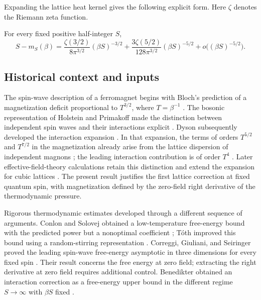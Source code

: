 Expanding the lattice heat kernel gives the following explicit form.
Here $\zeta$ denotes the Riemann zeta function.
\begin{corollary}\label{cor:expansion}
For every fixed positive half-integer $S$,
\[
 S-m_S(\beta)
 =\frac{\zeta(3/2)}{8\pi^{3/2}}(\beta S)^{-3/2}
  +\frac{3\zeta(5/2)}{128\pi^{3/2}}(\beta S)^{-5/2}
  +o\bigl((\beta S)^{-5/2}\bigr).
\]
\end{corollary}

\subsection{Historical context and inputs}

The spin-wave description of a ferromagnet begins with Bloch's prediction
of a magnetization deficit proportional to \(T^{3/2}\), where \(T=\beta^{-1}\)
\cite{Bloch1930}.  The bosonic representation of Holstein and Primakoff
made the distinction between independent spin waves and their interactions
explicit \cite{HolsteinPrimakoff1940}.  Dyson subsequently developed the
interaction expansion \cite{Dyson1956a,Dyson1956b}.  In that expansion,
the terms of orders \(T^{5/2}\) and \(T^{7/2}\) in the magnetization already
arise from the lattice dispersion of independent magnons
\cite[Section~5, Equation~(71)]{Dyson1956b}; the leading interaction
contribution is of order \(T^4\)
\cite[Section~8, Equation~(122)]{Dyson1956b}.
Later effective-field-theory calculations retain this distinction and
extend the expansion for cubic lattices \cite{Hofmann2017}.
The present result justifies the first lattice correction at fixed quantum
spin, with magnetization defined by the zero-field right derivative of the
thermodynamic pressure.

Rigorous thermodynamic estimates developed through a different sequence
of arguments.  Conlon and Solovej obtained a low-temperature free-energy
bound with the predicted power but a nonoptimal coefficient
\cite{ConlonSolovej1991}; T\'oth improved this bound using a random-stirring
representation \cite{Toth1993}.  Correggi, Giuliani, and Seiringer proved
the leading spin-wave free-energy asymptotic in three dimensions for every
fixed spin \cite[Theorem~2.1]{CGS2015}.  Their result concerns the free
energy at zero field; extracting the right derivative at zero field
requires additional control.  Benedikter obtained an interaction
correction as a free-energy upper bound in the different regime
\(S\to\infty\) with \(\beta S\) fixed \cite{Benedikter2017}.

